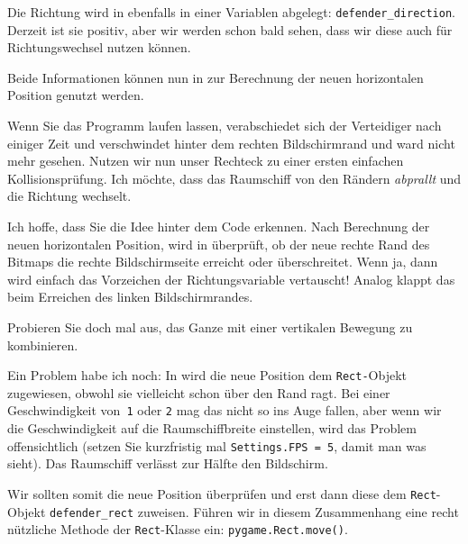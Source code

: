 Die Richtung wird in  ebenfalls in einer Variablen abgelegt: \texttt{defender\_direction}. Derzeit ist sie positiv, aber wir werden schon bald sehen, dass wir diese auch für Richtungswechsel nutzen können.

Beide Informationen können nun in  zur Berechnung der neuen horizontalen Position genutzt werden.

Wenn Sie das Programm laufen lassen, verabschiedet sich der Verteidiger nach einiger Zeit und verschwindet hinter dem rechten Bildschirmrand und ward nicht mehr gesehen. Nutzen wir nun unser Rechteck zu einer ersten einfachen Kollisionsprüfung. Ich möchte, dass das Raumschiff von den Rändern \emph{abprallt} und die Richtung wechselt. 


Ich hoffe, dass Sie die Idee hinter dem Code erkennen. Nach Berechnung der neuen horizontalen Position, wird in  überprüft, ob der neue rechte Rand des Bitmaps die rechte Bildschirmseite erreicht oder überschreitet. Wenn ja, dann wird einfach das Vorzeichen der Richtungsvariable vertauscht! Analog klappt das beim Erreichen des linken Bildschirmrandes. 

Probieren Sie doch mal aus, das Ganze mit einer vertikalen Bewegung zu kombinieren.

Ein Problem habe ich noch: In  wird die neue Position dem \texttt{Rect-}Objekt zugewiesen, obwohl sie vielleicht schon über den Rand ragt. Bei einer Geschwindigkeit von~\texttt{1} oder \texttt{2} mag das nicht so ins Auge fallen, aber wenn wir die Geschwindigkeit auf die Raumschiffbreite einstellen, wird das Problem offensichtlich (setzen Sie kurzfristig mal \texttt{Settings.FPS = 5}, damit man was sieht). Das Raumschiff verlässt zur Hälfte den Bildschirm. 

Wir sollten somit die neue Position überprüfen und erst dann diese dem \texttt{Rect}-Objekt \texttt{defender\_rect} zuweisen. Führen wir in diesem Zusammenhang eine recht nützliche Methode der \texttt{Rect}-Klasse ein: \texttt{pygame.Rect.move()}.


